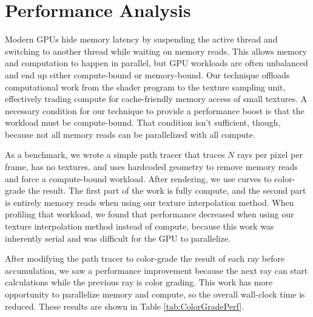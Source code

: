 \documentclass{jcgt}
\begin{document}
\section{Performance Analysis}

Modern GPUs hide memory latency by suspending the active thread and switching to another thread while waiting on memory reads. This allows memory and computation to happen in parallel, but GPU workloads are often unbalanced and end up either compute-bound or memory-bound. Our technique offloads
computational work from the shader program to the texture sampling unit, effectively trading compute for cache-friendly memory access of small textures. A necessary condition for our technique to provide a performance boost is that the workload must be compute-bound.
That condition isn't sufficient, though, because not all memory reads can be parallelized with all compute.

As a benchmark, we wrote a simple path tracer that traces $N$ rays per pixel per frame, has no textures, and uses hardcoded geometry to remove memory reads and force a compute-bound workload. After rendering, we use curves to color-grade the result. The first part of the work is fully compute, and the second part is entirely memory
reads when using our texture interpolation method. When profiling that workload, we found that performance decreased when using our texture interpolation method instead of compute, because this work was inherently serial and was difficult for the GPU to parallelize.

After modifying the path tracer to color-grade the result of each ray before accumulation, we saw a performance improvement because the next ray can start calculations while the previous ray is color grading. This work has more opportunity to parallelize memory and compute,
so the overall wall-clock time is reduced. These results are shown in Table \ref{tab:ColorGradePerf}.
\end{document}
